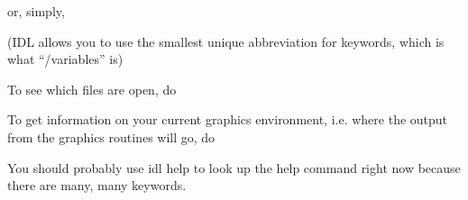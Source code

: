 
  or, simply, 


  (IDL allows you to use the smallest unique abbreviation for
  keywords, which is what ``/variables'' is)

  To see which files are open, do


  To get information on your current graphics environment, i.e. where
  the output from the graphics routines will go, do


  You should probably use idl help to look up the help command right
  now because there are many, many keywords.





